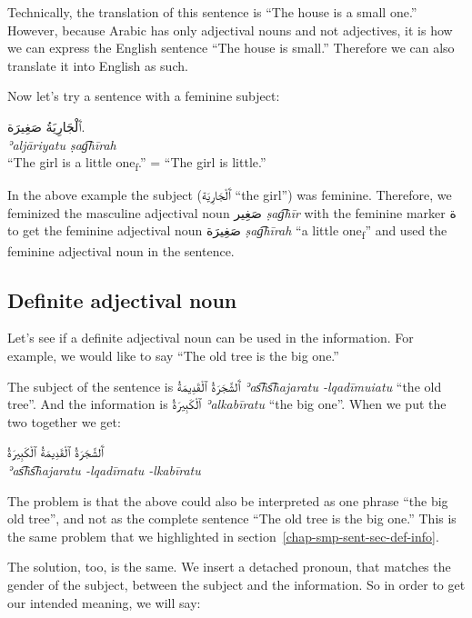 \documentclass[
  10pt,
]{book}
\begin{document}
Technically, the translation of this sentence is \enquote{The house is a small one.}
However, because Arabic has only adjectival nouns and not adjectives, it is how we can express the English sentence \enquote{The house is small.} Therefore we can also translate it into English as such.

Now let's try a sentence with a feminine subject:

\foreignlanguage{arabic}{ٱَلْجَارِيَةُ صَغِيرَة.}\\
\emph{ʾaljāriyatu ṣag͡hīrah}\\
\enquote{The girl is a little one\textsubscript{f}.} = \enquote{The girl is little.}

In the above example the subject (\foreignlanguage{arabic}{ٱَلْجَارِيَة} \enquote{the girl}) was feminine. Therefore, we feminized the masculine adjectival noun \foreignlanguage{arabic}{صَغِير} \emph{ṣag͡hīr} with the feminine marker \foreignlanguage{arabic}{ة} to get the feminine adjectival noun
\foreignlanguage{arabic}{صَغِيرَة} \emph{ṣag͡hīrah} \enquote{a little one\textsubscript{f}}
and used the feminine adjectival noun in the sentence.

\subsection{Definite adjectival noun}\label{definite-adjectival-noun}

Let's see if a definite adjectival noun can be used in the information. For example, we would like to say \enquote{The old tree is the big one.}

The subject of the sentence is \foreignlanguage{arabic}{ٱَلشَّجَرَةُ ٱلْقَدِيمَةُ} \emph{ʾas͡hs͡hajaratu -lqadīmuiatu} \enquote{the old tree}.
And the information is \foreignlanguage{arabic}{ٱلْکَبِيرَةُ} \emph{ʾalkabīratu} \enquote{the big one}. When we put the two together we get:

\foreignlanguage{arabic}{ٱَلشَّجَرَةُ ٱلْقَدِيمَةُ ٱلْکَبِيرَةُ}\\
\emph{ʾas͡hs͡hajaratu -lqadīmatu -lkabīratu}

The problem is that the above could also be interpreted as one phrase \enquote{the big old tree}, and not as the complete sentence \enquote{The old tree is the big one.} This is the same problem that we highlighted in section~\ref{chap-smp-sent-sec-def-info}.

The solution, too, is the same. We insert a detached pronoun, that matches the gender of the subject, between the subject and the information. So in order to get our intended meaning, we will say:
\end{document}
